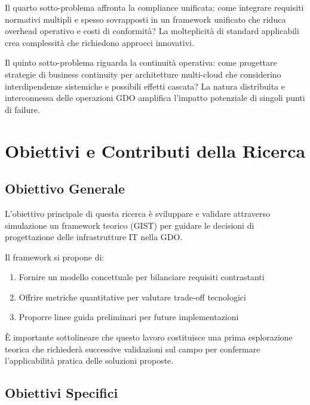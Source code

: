 \documentclass[12pt,a4paper,oneside]{book}
\numberwithin{figure}{chapter} %
\numberwithin{table}{chapter}  %
\begin{document}
Il quarto sotto-problema affronta la compliance unificata: come
integrare requisiti normativi multipli e spesso sovrapposti in un
framework unificato che riduca overhead operativo e costi di conformità?
La molteplicità di standard applicabili crea complessità che richiedono approcci innovativi.

Il quinto sotto-problema riguarda la continuità operativa: come
progettare strategie di business continuity per architetture multi-cloud
che considerino interdipendenze sistemiche e possibili effetti cascata?
La natura distribuita e interconnessa delle operazioni GDO amplifica
l'impatto potenziale di singoli punti di failure.

\section{\texorpdfstring{\textbf{Obiettivi e Contributi della
Ricerca}}{1.3 Obiettivi e Contributi della Ricerca}}\label{obiettivi-e-contributi-della-ricerca}

\subsection{\texorpdfstring{\textbf{Obiettivo
Generale}}{1.3.1 Obiettivo Generale}}\label{obiettivo-generale}

L'obiettivo principale di questa ricerca è sviluppare e validare attraverso 
simulazione un framework teorico (GIST) per guidare le decisioni di 
progettazione delle infrastrutture IT nella GDO. 

Il framework si propone di:
\begin{enumerate}
    \item 
    Fornire un modello concettuale per bilanciare requisiti contrastanti
    \item 
    Offrire metriche quantitative per valutare trade-off tecnologici
    \item 
    Proporre linee guida preliminari per future implementazioni
\end{enumerate}

È importante sottolineare che questo lavoro costituisce una prima 
esplorazione teorica che richiederà successive validazioni sul campo 
per confermare l'applicabilità pratica delle soluzioni proposte.

\subsection{\texorpdfstring{\textbf{Obiettivi
Specifici}}{1.3.2 Obiettivi Specifici}}\label{obiettivi-specifici}
\end{document}

